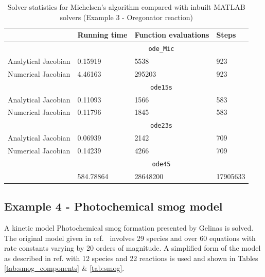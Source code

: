 \documentclass[letterpaper,12pt,onehalfspacing,twoside]{article}
\theoremstyle{msds}
\begin{document}
\begin{table}[htbp]
\centering
\caption{Solver statistics for Michelsen's algorithm compared with inbuilt MATLAB solvers (Example 3 - Oregonator reaction)}
\label{tab:ex3_solvers}
\begin{tabular}{llll}
\hline
                    & Running time  & Function evaluations    & Steps     \\ \hline
                    & \multicolumn{3}{c}{\texttt{ode\_Mic}} \\ \cmidrule(l){2-4} 
Analytical Jacobian & 0.15919      & 5538      & 923       \\
Numerical Jacobian  & 4.46163      & 295203    & 923       \\ \cmidrule(l){2-4} 
                    & \multicolumn{3}{c}{\texttt{ode15s}}   \\ \cmidrule(l){2-4} 
Analytical Jacobian & 0.11093      & 1566      & 583       \\
Numerical Jacobian  & 0.11796      & 1845      & 583       \\ \cmidrule(l){2-4} 
                    & \multicolumn{3}{c}{\texttt{ode23s}}   \\ \cmidrule(l){2-4} 
Analytical Jacobian & 0.06939      & 2142      & 709       \\
Numerical Jacobian  & 0.14239       & 4266      & 709       \\ \cmidrule(l){2-4} 
                    & \multicolumn{3}{c}{\texttt{ode45}}    \\ \cmidrule(l){2-4} 
		       & 584.78864     & 28648200  & 17905633  \\ \hline
\end{tabular}
\end{table}

\newpage
\subsection{Example 4 - Photochemical smog model}

A kinetic model Photochemical smog formation presented by Gelinas \citep{GELINAS1972222} is solved. The original model given in ref.~\citep{GELINAS1972222} involves 29 species and over 60 equations with rate constants varying by 20 orders of magnitude. A simplified form of the model as described in ref. \citep{MICHELSEN1977107} with 12 species and 22 reactions is used and shown in Tables \ref{tab:smog_components} \& \ref{tab:smog}. 
\end{document}
